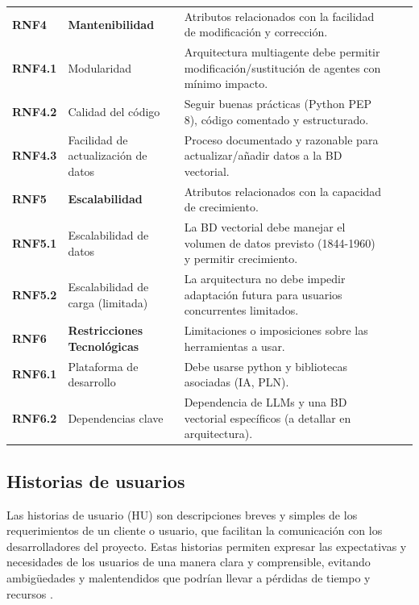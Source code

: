 \begin{longtable}{@{}l >{\raggedright\arraybackslash}p{4cm} >{\raggedright\arraybackslash}p{7cm} l l@{}}
	\textbf{RNF4} & \textbf{Mantenibilidad} & Atributos relacionados con la facilidad de modificación y corrección. \\
	\textbf{RNF4.1} & Modularidad & Arquitectura multiagente debe permitir modificación/sustitución de agentes con mínimo impacto. \\
	\textbf{RNF4.2} & Calidad del código & Seguir buenas prácticas (Python PEP 8), código comentado y estructurado. \\
	\textbf{RNF4.3} & Facilidad de actualización de datos & Proceso documentado y razonable para actualizar/añadir datos a la BD vectorial. \\
	\midrule
	
	\textbf{RNF5} & \textbf{Escalabilidad} & Atributos relacionados con la capacidad de crecimiento. \\
	\textbf{RNF5.1} & Escalabilidad de datos & La BD vectorial debe manejar el volumen de datos previsto (1844-1960) y permitir crecimiento. \\
	\textbf{RNF5.2} & Escalabilidad de carga (limitada) & La arquitectura no debe impedir adaptación futura para usuarios concurrentes limitados. \\
	\midrule
	
	\textbf{RNF6} & \textbf{Restricciones Tecnológicas} & Limitaciones o imposiciones sobre las herramientas a usar. \\
	\textbf{RNF6.1} & Plataforma de desarrollo & Debe usarse python y bibliotecas asociadas (IA, PLN). \\
	\textbf{RNF6.2} & Dependencias clave & Dependencia de LLMs y una BD vectorial específicos (a detallar en arquitectura). \\
	
\end{longtable}


\subsection{Historias de usuarios}

Las historias de usuario (HU) son descripciones breves y simples de los requerimientos de un cliente o usuario, que facilitan la comunicación con los desarrolladores del proyecto. Estas historias permiten expresar las expectativas y necesidades de los usuarios de una manera clara y comprensible, evitando ambigüedades y malentendidos que podrían llevar a pérdidas de tiempo y recursos \cite{menzinsky2018historias}.

